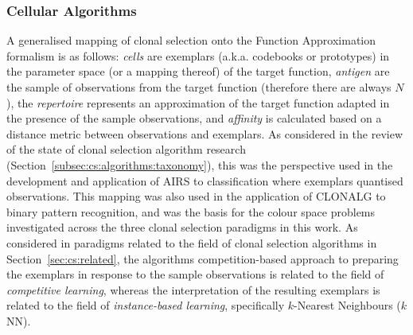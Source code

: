 %
%
\subsubsection{Cellular Algorithms}
\label{subsec:iidle:function:approximation:applicability:cells}
A generalised mapping of clonal selection onto the Function Approximation formalism is as follows: \emph{cells} are exemplars (a.k.a. codebooks or prototypes) in the parameter space (or a mapping thereof) of the target function, \emph{antigen} are the sample of observations from the target function (therefore there are always $N$), the \emph{repertoire} represents an approximation of the target function adapted in the presence of the sample observations, and \emph{affinity} is calculated based on a distance metric between observations and exemplars. 
As considered in the review of the state of clonal selection algorithm research (Section~\ref{subsec:cs:algorithms:taxonomy}), this was the perspective used in the development and application of AIRS to classification where exemplars quantised observations. This mapping was also used in the application of CLONALG to binary pattern recognition, and was the basis for the colour space problems investigated across the three clonal selection paradigms in this work. 
As considered in paradigms related to the field of clonal selection algorithms in Section~\ref{sec:cs:related}, the algorithms competition-based approach to preparing the exemplars in response to the sample observations is related to the field of \emph{competitive learning}, whereas the interpretation of the resulting exemplars is related to the field of \emph{instance-based learning}, specifically $k$-Nearest Neighbours ($k$NN).

